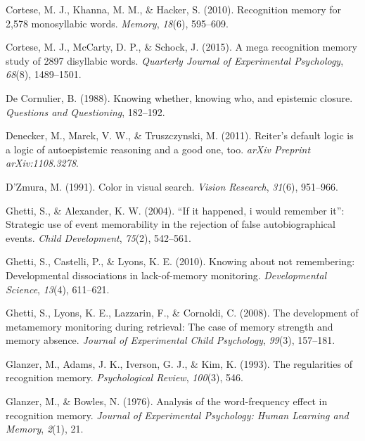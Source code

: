 \documentclass[12pt,twoside]{reedthesis}
\begin{document}
\leavevmode\hypertarget{ref-cortese2010recognition}{}%
Cortese, M. J., Khanna, M. M., \& Hacker, S. (2010). Recognition memory for 2,578 monosyllabic words. \emph{Memory}, \emph{18}(6), 595--609.

\leavevmode\hypertarget{ref-cortese2015mega}{}%
Cortese, M. J., McCarty, D. P., \& Schock, J. (2015). A mega recognition memory study of 2897 disyllabic words. \emph{Quarterly Journal of Experimental Psychology}, \emph{68}(8), 1489--1501.

\leavevmode\hypertarget{ref-de1988knowing}{}%
De Cornulier, B. (1988). Knowing whether, knowing who, and epistemic closure. \emph{Questions and Questioning}, 182--192.

\leavevmode\hypertarget{ref-denecker2011reiter}{}%
Denecker, M., Marek, V. W., \& Truszczynski, M. (2011). Reiter's default logic is a logic of autoepistemic reasoning and a good one, too. \emph{arXiv Preprint arXiv:1108.3278}.

\leavevmode\hypertarget{ref-d1991color}{}%
D'Zmura, M. (1991). Color in visual search. \emph{Vision Research}, \emph{31}(6), 951--966.

\leavevmode\hypertarget{ref-ghetti2004if}{}%
Ghetti, S., \& Alexander, K. W. (2004). ``If it happened, i would remember it'': Strategic use of event memorability in the rejection of false autobiographical events. \emph{Child Development}, \emph{75}(2), 542--561.

\leavevmode\hypertarget{ref-ghetti2010knowing}{}%
Ghetti, S., Castelli, P., \& Lyons, K. E. (2010). Knowing about not remembering: Developmental dissociations in lack-of-memory monitoring. \emph{Developmental Science}, \emph{13}(4), 611--621.

\leavevmode\hypertarget{ref-ghetti2008development}{}%
Ghetti, S., Lyons, K. E., Lazzarin, F., \& Cornoldi, C. (2008). The development of metamemory monitoring during retrieval: The case of memory strength and memory absence. \emph{Journal of Experimental Child Psychology}, \emph{99}(3), 157--181.

\leavevmode\hypertarget{ref-glanzer1993regularities}{}%
Glanzer, M., Adams, J. K., Iverson, G. J., \& Kim, K. (1993). The regularities of recognition memory. \emph{Psychological Review}, \emph{100}(3), 546.

\leavevmode\hypertarget{ref-glanzer1976analysis}{}%
Glanzer, M., \& Bowles, N. (1976). Analysis of the word-frequency effect in recognition memory. \emph{Journal of Experimental Psychology: Human Learning and Memory}, \emph{2}(1), 21.
\end{document}
